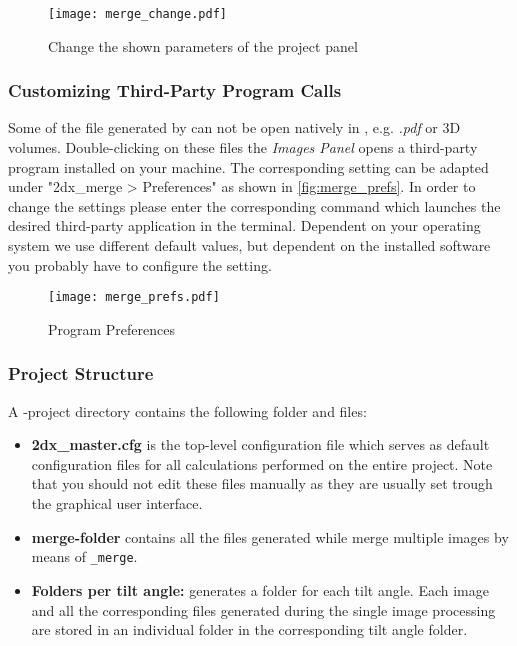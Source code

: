 \begin{figure}[H]
	\centering
	\texttt{[image: merge\_change.pdf]}
	\caption{Change the shown parameters of the project panel}
	\label{fig:project_panel_params}
\end{figure}


\subsubsection{Customizing Third-Party Program Calls}
\label{sec:open_program}

Some of the file generated by {\twodx} can not be open natively in {\twodx}, e.g. \textit{.pdf} or 3D volumes. Double-clicking on these files the \textit{Images Panel} opens a third-party program installed on your machine. The corresponding setting can be adapted under "2dx\_merge > Preferences" as shown in \autoref{fig:merge_prefs}. In order to change the settings please enter the corresponding command which launches the desired third-party application in the terminal. Dependent on your operating system we use different default values, but dependent on the installed software you probably have to configure the setting.

\begin{figure}[H]
	\centering
	\texttt{[image: merge\_prefs.pdf]}
	\caption{Program Preferences}
	\label{fig:merge_prefs}
\end{figure}


\subsubsection{{\twodx} Project Structure}
\label{sec:project_struc}

A {\twodx}-project directory contains the following folder and files:

\begin{itemize}
	\item \textbf{2dx\_master.cfg} is the top-level configuration file which serves as default configuration files for all calculations performed on the entire project. Note that you should not edit these files manually as they are usually set trough the graphical user interface.
	\item \textbf{merge-folder} contains all the files generated while merge multiple images by means of {\twodx}\texttt{\_merge}.
	\item \textbf{Folders per tilt angle:} {\twodx} generates a folder for each tilt angle. Each image and all the corresponding files generated during the single image processing are stored in an individual folder in the corresponding tilt angle folder. 
\end{itemize}


